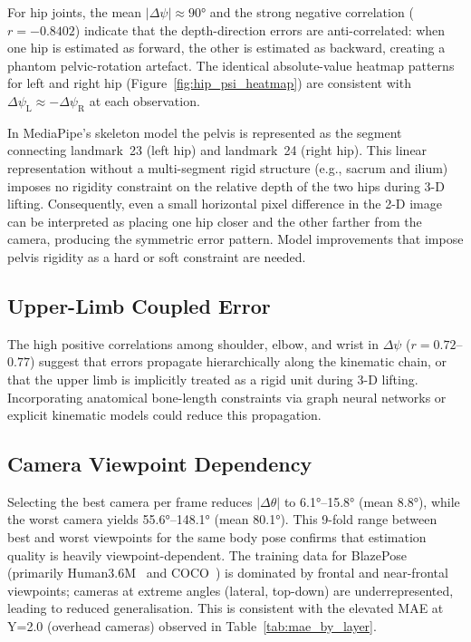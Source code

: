 \documentclass[twocolumn]{article}
\begin{document}
For hip joints, the mean $|\Delta\psi|\approx90°$ and the strong negative
correlation ($r=-0.8402$) indicate that the depth-direction errors are
anti-correlated: when one hip is estimated as forward, the other is
estimated as backward, creating a phantom pelvic-rotation artefact. The
identical absolute-value heatmap patterns for left and right hip
(Figure~\ref{fig:hip_psi_heatmap}) are consistent with
$\Delta\psi_{\text{L}} \approx -\Delta\psi_{\text{R}}$ at each observation.

In MediaPipe's skeleton model the pelvis is represented as the segment
connecting landmark~23 (left hip) and landmark~24 (right hip). This linear
representation without a multi-segment rigid structure (e.g., sacrum and
ilium) imposes no rigidity constraint on the relative depth of the two
hips during 3-D lifting. Consequently, even a small horizontal pixel
difference in the 2-D image can be interpreted as placing one hip closer
and the other farther from the camera, producing the symmetric error
pattern. Model improvements that impose pelvis rigidity as a hard or soft
constraint are needed.

\subsection{Upper-Limb Coupled Error}

The high positive correlations among shoulder, elbow, and wrist in
$\Delta\psi$ ($r=0.72$–$0.77$) suggest that errors propagate
hierarchically along the kinematic chain, or that the upper limb is
implicitly treated as a rigid unit during 3-D lifting. Incorporating
anatomical bone-length constraints via graph neural networks or explicit
kinematic models could reduce this propagation.

\subsection{Camera Viewpoint Dependency}

Selecting the best camera per frame reduces $|\Delta\theta|$ to 6.1°–15.8°
(mean 8.8°), while the worst camera yields 55.6°–148.1° (mean 80.1°).
This 9-fold range between best and worst viewpoints for the same body pose
confirms that estimation quality is heavily viewpoint-dependent.
The training data for BlazePose (primarily Human3.6M~\cite{h36m} and
COCO~\cite{coco}) is dominated by frontal and near-frontal viewpoints;
cameras at extreme angles (lateral, top-down) are underrepresented, leading
to reduced generalisation. This is consistent with the elevated MAE at
Y=2.0 (overhead cameras) observed in Table~\ref{tab:mae_by_layer}.
\end{document}
